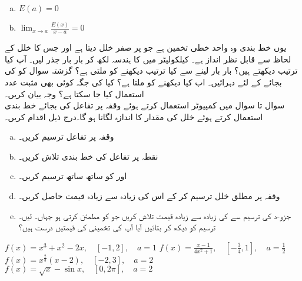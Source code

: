\begin{enumerate}[a.]
\item
$E(a)=0$\quad\quad  {}
\item
$\lim_{x\to a}\frac{E(x)}{x-a}=0$ \quad \quad {}
\end{enumerate}
یوں خط بندی  وہ واحد خطی تخمین ہے جو  پر صفر خلل دیتا ہے اور جس کا خلل کے لحاظ سے قابل نظر انداز ہے۔
کیلکولیٹر میں  کا ہندسہ لکھ کر بار بار جذر لیں۔ آپ کیا ترتیب دیکھتے ہیں؟ بار بار  لینے سے کیا ترتیب دیکھنے کو ملتی ہے؟
گزشتہ سوال کو  کی بجائے  کے لئے دہرائیں۔ اب کیا دیکھنے کو ملتا ہے؟ کیا  کی جگہ کوئی بھی مثبت عدد  استعمال کیا جا سکتا ہے؟ وجہ بیان کریں۔
\\
سوال  تا سوال  میں کمپیوٹر استعمال کرتے ہوئے وقفہ  پر  تفاعل کی بجائے خط بندی استعمال کرتے ہوئے خلل کی مقدار کا اندازہ لگانا ہو گا۔درج ذیل اقدام کریں۔
\begin{enumerate}[a.]
\item
وقفہ  پر تفاعل  ترسیم کریں۔
\item
نقطہ  پر تفاعل کی خط بندی  تلاش کریں۔
\item
{} اور  کو ساتھ ساتھ ترسیم کریں۔
\item
وقفہ  پر مطلق خلل  ترسیم کر کے اس کی زیادہ سے زیادہ قیمت حاصل کریں۔
\item
جزو-د کی ترسیم سے  کی زیادہ سے زیادہ قیمت تلاش کریں جو  کو مطمئن کرتی ہو جہاں۔  لیں۔ ترسیم کو دیکھ کر بتائیں آیا آپ کی تخمینی   کی قیمتیں درست ہیں؟ 
\end{enumerate} 

$f(x)=x^3+x^2-2x,\quad [-1,2],\quad a=1$
$f(x)=\frac{x-1}{4x^2+1},\quad [-\frac{3}{4},1],\quad a=\frac{1}{2}$
$f(x)=x^{\tfrac{2}{3}}(x-2),\quad [-2,3],\quad a=2$
$f(x)=\sqrt{x}-\sin x,\quad [0,2\pi],\quad a=2$

